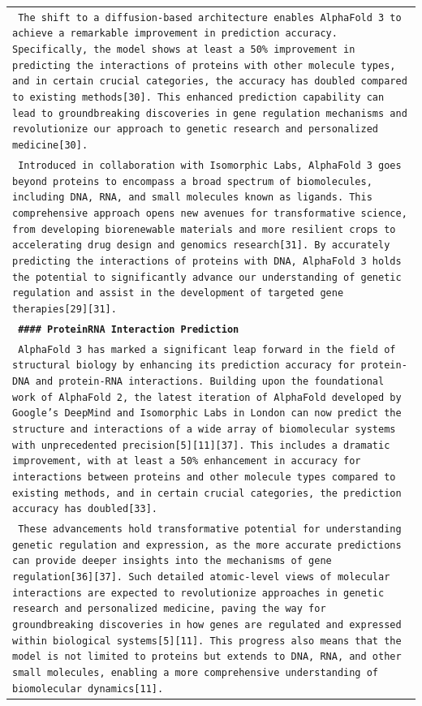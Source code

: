 \documentclass[11pt]{article}
\begin{document}
\begin{longtable}{p{\textwidth}}
\texttt{\small{ The shift to a diffusion-based architecture enables AlphaFold 3 to achieve a remarkable improvement in prediction accuracy. Specifically, the model shows at least a 50\% improvement in predicting the interactions of proteins with other molecule types, and in certain crucial categories, the accuracy has doubled compared to existing methods[30]. This enhanced prediction capability can lead to groundbreaking discoveries in gene regulation mechanisms and revolutionize our approach to genetic research and personalized medicine[30]. }} \\
\texttt{\small{ Introduced in collaboration with Isomorphic Labs, AlphaFold 3 goes beyond proteins to encompass a broad spectrum of biomolecules, including DNA, RNA, and small molecules known as ligands. This comprehensive approach opens new avenues for transformative science, from developing biorenewable materials and more resilient crops to accelerating drug design and genomics research[31]. By accurately predicting the interactions of proteins with DNA, AlphaFold 3 holds the potential to significantly advance our understanding of genetic regulation and assist in the development of targeted gene therapies[29][31]. }} \\
\vspace{1pt}
\texttt{\small{\textbf{ \#\#\#\# ProteinRNA Interaction Prediction }}} \\
\texttt{\small{ AlphaFold 3 has marked a significant leap forward in the field of structural biology by enhancing its prediction accuracy for protein-DNA and protein-RNA interactions. Building upon the foundational work of AlphaFold 2, the latest iteration of AlphaFold developed by Google's DeepMind and Isomorphic Labs in London can now predict the structure and interactions of a wide array of biomolecular systems with unprecedented precision[5][11][37]. This includes a dramatic improvement, with at least a 50\% enhancement in accuracy for interactions between proteins and other molecule types compared to existing methods, and in certain crucial categories, the prediction accuracy has doubled[33]. }} \\
\texttt{\small{ These advancements hold transformative potential for understanding genetic regulation and expression, as the more accurate predictions can provide deeper insights into the mechanisms of gene regulation[36][37]. Such detailed atomic-level views of molecular interactions are expected to revolutionize approaches in genetic research and personalized medicine, paving the way for groundbreaking discoveries in how genes are regulated and expressed within biological systems[5][11]. This progress also means that the model is not limited to proteins but extends to DNA, RNA, and other small molecules, enabling a more comprehensive understanding of biomolecular dynamics[11]. }} \\

\end{longtable}
\end{document}
